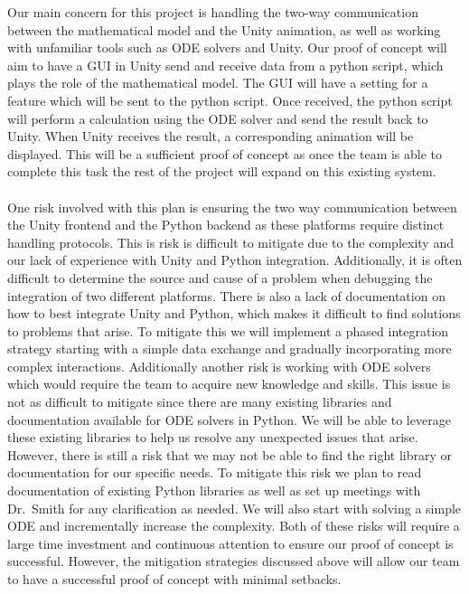 \documentclass{article}
\begin{document}
Our main concern for this project is handling the two-way communication between the mathematical model and the Unity animation, as well as working with unfamiliar tools such as ODE solvers and Unity.
Our proof of concept will aim to have a GUI in Unity send and receive data from a python script, which plays the role of the mathematical model.
The GUI will have a setting for a feature which will be sent to the python script. 
Once received, the python script will perform a calculation using the ODE solver and send the result back to Unity.
When Unity receives the result, a corresponding animation will be displayed.
This will be a sufficient proof of concept as once the team is able to complete this task the rest of the project will expand on this existing system. 
\\\\
\noindent One risk involved with this plan is ensuring the two way communication between the Unity frontend and the Python backend as these platforms require distinct handling protocols. 
This is risk is difficult to mitigate due to the complexity and our lack of experience with Unity and Python integration.
Additionally, it is often difficult to determine the source and cause of a problem when debugging the integration of two different platforms.
There is also a lack of documentation on how to best integrate Unity and Python, which makes it difficult to find solutions to problems that arise.
To mitigate this we will implement a phased integration strategy starting with a simple data exchange and gradually incorporating more complex interactions. 
Additionally another risk is working with ODE solvers which would require the team to acquire new knowledge and skills.
This issue is not as difficult to mitigate since there are many existing libraries and documentation available for ODE solvers in Python.
We will be able to leverage these existing libraries to help us resolve any unexpected issues that arise.
However, there is still a risk that we may not be able to find the right library or documentation for our specific needs.
To mitigate this risk we plan to read documentation of existing Python libraries as well as set up meetings with Dr.\ Smith for any clarification as needed. 
We will also start with solving a simple ODE and incrementally increase the complexity.
Both of these risks will require a large time investment and continuous attention to ensure our proof of concept is successful. 
However, the mitigation strategies discussed above will allow our team to have a successful proof of concept with minimal setbacks. 
\end{document}
